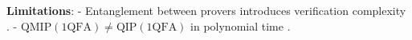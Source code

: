 \textbf{Limitations}: 
- Entanglement between provers introduces verification complexity \cite{yamakami2014constant}.
- \( \text{QMIP}(1\text{QFA}) \neq \text{QIP}(1\text{QFA}) \) in polynomial time \cite{nishimura2009application}.

